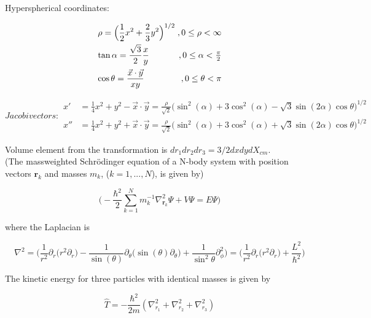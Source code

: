 \documentclass{article}
\begin{document}
Hyperspherical coordinates:
\[\arraycolsep=1.4pt\def\arraystretch{2.2}
     \left. \begin{array}{lr}
        \rho = \displaystyle \Big( \frac{1}{2}x^2 + \frac{2}{3}y^2 \Big) ^{1/2} &,  0\leq \rho < \infty\\
        \tan{\alpha} = \displaystyle \frac{\sqrt{3}}{2} \frac{x}{y} &,  0\leq \alpha < \frac{\pi}{2}\\
        \cos{\theta} = \displaystyle \frac{\vec{x} \cdot \vec{y}}{xy} &,  0\leq \theta < \pi
        \end{array}\right.
  \]

\begin{subequations}
Jacobi vectors:
\begin{align}
        x' &= \frac{1}{4} x^2 +y^2 -\vec{x} \cdot \vec{y} = \frac{\rho}{\sqrt{2}} \big( \sin^2(\alpha) + 3\cos^2(\alpha) - \sqrt{3}\sin(2\alpha)\cos{\theta}\big)^{1/2}\\
        x'' &= \frac{1}{4} x^2 +y^2 +\vec{x} \cdot \vec{y} = \frac{\rho}{\sqrt{2}} \big( \sin^2(\alpha) + 3\cos^2(\alpha) + \sqrt{3}\sin(2\alpha)\cos{\theta}\big)^{1/2}
\end{align}
\end{subequations}

Volume element from the transformation is $dr_1dr_2dr_3=3/2dxdydX_{cm}$.\\


(The massweighted Schr{\"o}dinger equation of a N-body system with position vectors $\bm{r}_k$ and masses $m_k$, ($k=1,...,N$), is given by)

\begin{equation}
\Bigg(-\frac{\hbar^2}{2} \sum_{k=1}^{N} m^{-1}_{k} \nabla^{2}_{\bm{r}_{k}} \Psi + V\Psi = E \Psi \Bigg)
\end{equation}

where the Laplacian is

\begin{equation}
\nabla^{2} = \Big( \frac{1}{r^2}\partial_{r} \big(r^2 \partial_{r}\big) - \frac{1}{\sin(\theta)} \partial_{\theta} \big( \sin(\theta) \partial_{\theta} \big) + \frac{1}{\sin^2{\theta}} \partial^{2}_{\phi} \Big) = \Big( \frac{1}{r^2} \partial_{r} \big( r^2 \partial_{r} \big) + \frac{L^2}{\hbar^2} \Big)
\end{equation}

The kinetic energy for three particles with identical masses is given by

\begin{equation}
\hat{T} = -\frac{\hbar^2}{2m}( \nabla^{2}_{r_1} + \nabla^{2}_{r_2} + \nabla^{2}_{r_3} )
\end{equation}
\end{document}
